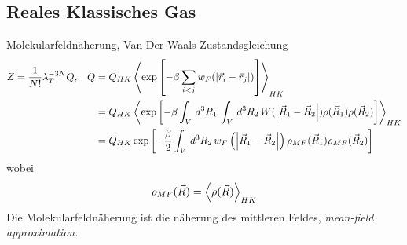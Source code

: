 \subsection*{Reales Klassisches Gas}
Molekularfeldn\"aherung, Van-Der-Waals-Zustandsgleichung
%
\begin{align*}
  Z = \frac{1}{N!} \lambda_T^{-3N} Q, && Q & = Q_{HK} 
  \Braket{\exp{\left[ -\beta \sum_{i < j}^{} w_F(\left| \vec{r}_i - \vec{r}_j \right|) \right]}}_{HK} \\
  &&& = Q_{HK} \Braket{\exp{\left[ - \beta \int_{V}^{} \,d^{3}R_1\, \int_{V}^{} \,d^3 R_2\,
  W(\left| \vec{R}_1 - \vec{R}_2 \right|) \rho(\vec{R}_1) \rho(\vec{R}_2) \right]}}_{HK} \\
  &&& = Q_{HK} \exp{\left[ -\frac{\beta}{2} \int_{V}^{ } \,d^3 R_2\, w_F \left(\left| \vec{R}_1 - \vec{R}_2 \right|\right) \rho_{MF}(\vec{R}_1) \rho_{MF}(\vec{R}_2) \right]}
\end{align*}
%
wobei %
\begin{align*}
  \rho_{MF} (\vec{R}) = \Braket{ \rho (\vec{R})}_{HK}
\end{align*}
%
Die Molekularfeldn\"aherung ist die n\"aherung des mittleren Feldes, 
\emph{mean-field approximation}.

